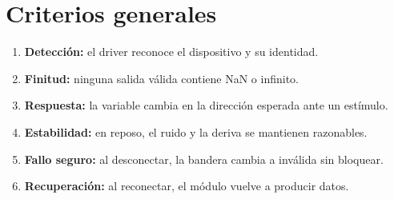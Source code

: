 \documentclass[11pt,a4paper,oneside]{report}
\begin{document}
\section{Criterios generales}
\begin{enumerate}
  \item \textbf{Detección:} el driver reconoce el dispositivo y su identidad.
  \item \textbf{Finitud:} ninguna salida válida contiene NaN o infinito.
  \item \textbf{Respuesta:} la variable cambia en la dirección esperada ante un estímulo.
  \item \textbf{Estabilidad:} en reposo, el ruido y la deriva se mantienen razonables.
  \item \textbf{Fallo seguro:} al desconectar, la bandera cambia a inválida sin bloquear.
  \item \textbf{Recuperación:} al reconectar, el módulo vuelve a producir datos.
\end{enumerate}
\end{document}
